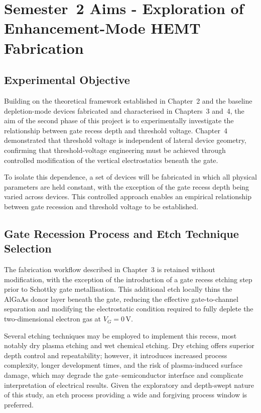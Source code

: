 \chapter{Semester~2 Aims - Exploration of Enhancement-Mode HEMT Fabrication }

\section{Experimental Objective}

Building on the theoretical framework established in Chapter~2 and the
baseline depletion-mode devices fabricated and characterised in
Chapters~3 and~4, the aim of the second phase of this project is to
experimentally investigate the relationship between gate recess depth
and threshold voltage. Chapter~4 demonstrated that threshold voltage is
independent of lateral device geometry, confirming that
threshold-voltage engineering must be achieved through controlled
modification of the vertical electrostatics beneath the gate.

\vspace{2mm}

To isolate this dependence, a set of devices will be fabricated in
which all physical parameters are held constant, with the exception of
the gate recess depth being varied across devices. This controlled
approach enables an empirical relationship between gate recession and
threshold voltage to be established.

\section{Gate Recession Process and Etch Technique Selection}

The fabrication workflow described in Chapter~3 is retained without
modification, with the exception of the introduction of a gate recess
etching step prior to Schottky gate metallisation. This additional etch
locally thins the AlGaAs donor layer beneath the gate, reducing the
effective gate-to-channel separation and modifying the electrostatic
condition required to fully deplete the two-dimensional electron gas at
$V_G = 0\,\mathrm{V}$.

\vspace{2mm}

Several etching techniques may be employed to implement this recess,
most notably dry plasma etching and wet chemical etching. Dry etching
offers superior depth control and repeatability; \cite{Cadence2024} however, it
introduces increased process complexity, longer development times, and
the risk of plasma-induced surface damage, which may degrade the
gate--semiconductor interface and complicate interpretation of
electrical results. \cite{ZAPPE1993227} Given the exploratory and depth-swept
nature of this study, an etch process providing a wide and forgiving
process window is preferred.

